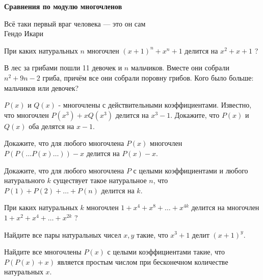 \centerline{\bf \Huge Сравнения по модулю многочленов}

\begin{flushright}
        \scriptsize{Всё таки первый враг человека --- это он сам\\
                    Гендо Икари}
\end{flushright}

При каких натуральных $n$ многочлен $(x+1)^n+x^n+1$ делится на $x^2+x+1$ ?

В лес за грибами пошли 11 девочек и $n$ мальчиков. Вместе они собрали $n^2+9 n-2$ гриба, причём все они собрали поровну грибов. Кого было больше: мальчиков или девочек?

$P(x)$ и $Q(x)$ - многочлены с действительными коэффициентами. Известно, что многочлен $P\left(x^3\right)+x Q\left(x^3\right)$ делится на $x^3-1$. Докажите, что $P(x)$ и $Q(x)$ оба делятся на $x-1$.

Докажите, что для любого многочлена $P(x)$ многочлен $P(P(\ldots P(x) \ldots))-x$ делится на $P(x)-x$.

Докажите, что для любого многочлена $P$ с целыми коэффициентами и любого натурального $k$ существует такое натуральное $n$, что $P(1)+P(2)+\ldots+P(n)$ делится на $k$.

При каких натуральных $k$ многочлен $1+x^4+x^8+\ldots+x^{4 k}$ делится на многочлен $1+x^2+x^4+\ldots+x^{2 k}$ ?

Найдите все пары натуральных чисел $x, y$ такие, что $x^3+1$ делит $(x+1)^y$.

Найдите все многочлены $P(x)$ с целыми коэффициентами такие, что $P(P(x)+x)$ является простым числом при бесконечном количестве натуральных $x$.